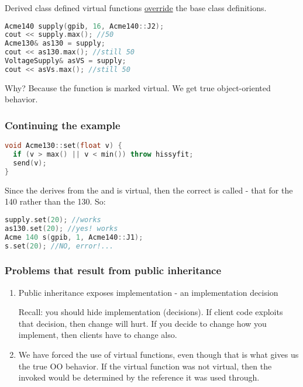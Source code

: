 Derived class defined virtual functions \underline{override} the base class definitions.

\begin{lstlisting}[language=C++]
Acme140 supply(gpib, 16, Acme140::J2);
cout << supply.max(); //50
Acme130& as130 = supply;
cout << as130.max(); //still 50
VoltageSupply& asVS = supply;
cout << asVs.max(); //still 50
\end{lstlisting}

Why? Because the  function is marked virtual. We get true object-oriented behavior.


\subsubsection{Continuing the example}

\begin{lstlisting}[language=C++]
void Acme130::set(float v) {
  if (v > max() || v < min()) throw hissyfit;
  send(v);
}
\end{lstlisting}

Since the  derives from the  and  is virtual, then the correct  is called - that for the 140 rather than the 130. So:

\begin{lstlisting}[language=C++]
supply.set(20); //works
as130.set(20); //yes! works
Acme 140 s(gpib, 1, Acme140::J1);
s.set(20); //NO, error!...
\end{lstlisting}

\subsubsection{Problems that result from public inheritance}

\begin{enumerate}
  \item Public inheritance exposes implementation - an implementation decision

  Recall: you should hide implementation (decisions). If client code exploits that decision, then change will hurt. If you decide to change how you implement, then clients have to change also.

  \item We have forced the use of virtual functions, even though that is what gives us the true OO behavior. If the virtual function  was not virtual, then the  invoked would be determined by the reference it was used through.

\end{enumerate}

